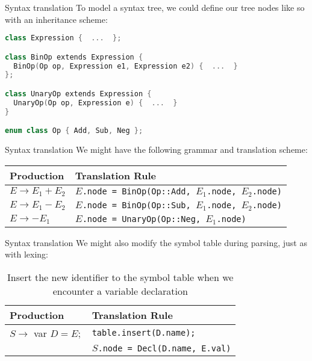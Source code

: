 \documentclass[../index.tex]{subfiles}
\begin{document}
\renewcommand{\currenttitle}{Syntax translation}
\begin{frame}[fragile]{\currenttitle}
  To model a syntax tree, we could define our tree nodes like so with an
  inheritance scheme: \\[1em]

  \begin{lstlisting}[language=C++]
class Expression {  ...  };

class BinOp extends Expression {
  BinOp(Op op, Expression e1, Expression e2) {  ...  }
};

class UnaryOp extends Expression {
  UnaryOp(Op op, Expression e) {  ...  }
}

enum class Op { Add, Sub, Neg };
  \end{lstlisting}
\end{frame}

\begin{frame}[fragile]{\currenttitle}
  We might have the following grammar and translation scheme: \\[1em]

  \begin{tabular}{l |l}
    Production & Translation Rule \\
    \hline
    $E \rightarrow E_1 + E_2$   & \texttt{$E$.node = BinOp(Op::Add, $E_1$.node, $E_2$.node)} \\
    $E \rightarrow E_1 - E_2$   & \texttt{$E$.node = BinOp(Op::Sub, $E_1$.node, $E_2$.node)} \\
    $E \rightarrow {-E_1}$      & \texttt{$E$.node = UnaryOp(Op::Neg, $E_1$.node)} \\
  \end{tabular}
\end{frame}

\begin{frame}[fragile]{\currenttitle}
  We might also modify the symbol table during parsing, just as with lexing:
  \\[1.5em]

  \begin{table}
    \centering
    \begin{tabular}{l |l}
      Production                    & Translation Rule \\
      \hline
      $S \rightarrow$ var $D = E ;$ & \texttt{table.insert(D.name);} \\
                                    & \texttt{$S$.node = Decl(D.name, E.val)}
    \end{tabular}
    \caption{Insert the new identifier to the symbol table when we encounter a
    variable declaration}
  \end{table}
\end{frame}
  
\end{document}
